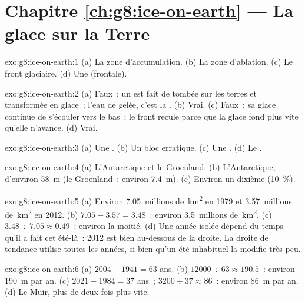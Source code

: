 \section*{Chapitre \ref{ch:g8:ice-on-earth} --- La glace sur la Terre}

\begin{solution}{exo:g8:ice-on-earth:1}
(a) La zone d'accumulation. (b) La zone d'ablation. (c) Le front
glaciaire. (d) Une  (frontale).
\end{solution}

\begin{solution}{exo:g8:ice-on-earth:2}
(a) Faux~: un  est fait de  tombée sur les terres et
transformée en glace~; l'eau de  gelée, c'est la . (b) Vrai.
(c) Faux~: sa glace continue de s'écouler vers le bas~; le front recule
parce que la glace fond plus vite qu'elle n'avance. (d) Vrai.
\end{solution}

\begin{solution}{exo:g8:ice-on-earth:3}
(a) Une . (b) Un bloc erratique. (c) Une . (d) Le .
\end{solution}

\begin{solution}{exo:g8:ice-on-earth:4}
(a) L'Antarctique et le Groenland. (b) L'Antarctique, d'environ
\qty{58}{m} (le Groenland~: environ \qty{7.4}{m}). (c) Environ un dixième
(10~\%).
\end{solution}

\begin{solution}{exo:g8:ice-on-earth:5}
(a) Environ \num{7.05}~millions de~\unit{km^2} en 1979 et
\num{3.57}~millions de~\unit{km^2} en 2012. (b) $7.05 - 3.57 = 3.48$~:
environ \num{3.5}~millions de~\unit{km^2}. (c) $3.48 \div 7.05 \approx 0.49$~:
environ la moitié. (d) Une année isolée dépend du temps qu'il a fait cet
été-là~: 2012 est bien au-dessous de la droite. La droite de tendance
utilise toutes les années, si bien qu'un été inhabituel la modifie très
peu.
\end{solution}

\begin{solution}{exo:g8:ice-on-earth:6}
(a) $2004 - 1941 = 63$ ans. (b) $12000 \div 63 \approx 190.5$~: environ
\qty{190}{m} par an. (c) $2021 - 1984 = 37$ ans~; $3200 \div 37 \approx
86$~: environ \qty{86}{m} par an. (d) Le  Muir, plus de deux fois
plus vite.
\end{solution}


